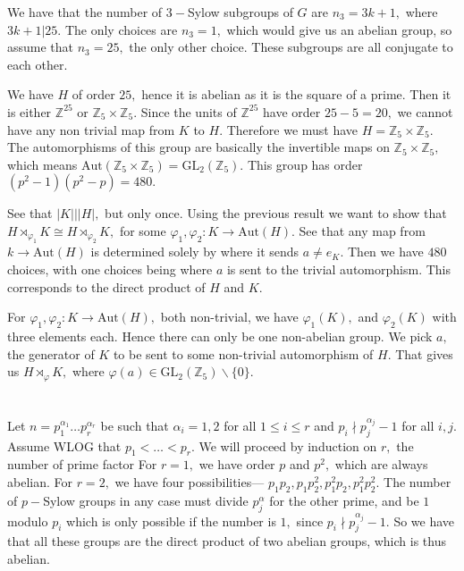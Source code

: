 \documentclass{article}
\begin{document}
We have that the number of $3-$Sylow subgroups of $G$ are $n_3=3k+1,$ where $3k+1|25.$ The only choices are $n_3=1,$ which would give us an abelian group, 
so assume that $n_3=25,$ the only other choice. These subgroups are all conjugate to each other. 

We have $H$ of order $25,$ hence it is abelian as it is the square of a prime. Then it is either $\mathbb{Z}^{25}$ or $\mathbb{Z}_5 \times \mathbb{Z}_5 .$ 
Since the units of $\mathbb{Z}^{25}$ have order $25-5=20,$ we cannot have any non trivial map from $K$ to $H.$ Therefore we must have $H=\mathbb{Z}_5 \times 
\mathbb{Z}_5.$ The automorphisms of this group are basically the invertible maps on $\mathbb{Z}_5 \times \mathbb{Z}_5,$ which means $\text{Aut}(\mathbb{Z}_5 
\times \mathbb{Z}_5)=\text{GL}_2(\mathbb{Z}_5).$ This group has order $(p^2-1)(p^2-p)=480.$ 

See that $|K|||H|,$ but only once. Using the previous result we want to show that $H \rtimes_{\varphi_1} K \cong H \rtimes_{\varphi_2} K,$ for some 
$\varphi_1, \varphi_2: K \to \text{Aut}(H).$ See that any map from $k \to \text{Aut}(H)$ is determined solely by where it sends $a \neq e_K.$ Then we have 
$480$ choices, with one choices being where $a$ is sent to the trivial automorphism. This corresponds to the direct product of $H$ and $K.$ 

For $\varphi_1, \varphi_2: K \to \text{Aut}(H),$ both non-trivial, we have $\varphi_1(K),$ and $\varphi_2(K)$ with three elements each. Hence there can only 
be one non-abelian group. We pick $a,$ the generator of $K$ to be sent to some non-trivial automorphism of $H.$ That gives us $H \rtimes_{\varphi} K,$ where 
$\varphi(a) \in \text{GL}_2(\mathbb{Z}_5)\backslash \{0\}.$ 
\section{} %
Let $n= p_1^{\alpha_1}\dots p_r^{\alpha_r}$ be such that $\alpha_i=1,2$ for all $1 \leq i \leq r$ and $p_i \nmid p_j^{\alpha_j}-1$ for all $i,j.$ 
Assume WLOG that $p_1 < \dots < p_r.$ We will proceed by induction on $r,$ the number of prime factor For $r=1,$ we have order $p$ and $p^2,$ which are 
always abelian. For $r=2,$ we have four possibilities--- $p_1p_2, p_1p_2^2, p_1^2p_2, p_1^2p_2^2.$ The number of $p-$Sylow groups in any case must divide 
$p_j^{\alpha}$ for the other prime, and be $1$ modulo $p_i$ which is only possible if the number is $1,$ since $p_i \nmid p_j^{\alpha_j}-1.$
So we have that all these groups are the direct product of two abelian groups, which is thus abelian.
\end{document}
